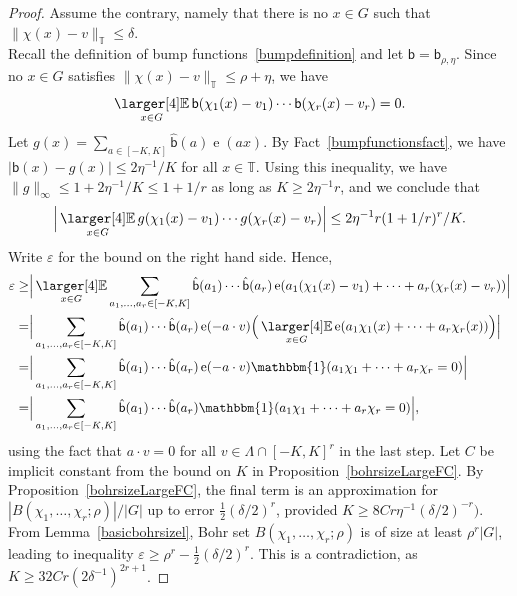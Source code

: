 \documentclass[a4paper,11pt]{article}
\numberwithin{theorem}{section}
\theoremstyle{definition}
\newcommand\id{\mathbbm{1}}
\newcommand{\on}[1]{
	\operatorname{#1}
}
\newcommand{\exx}{
  \mathop{
    \mathchoice{\vcenter{\hbox{\larger[4]$\mathbb{E}$}}}
               {\kern0pt\mathbb{E}}
               {\kern0pt\mathbb{E}}
               {\kern0pt\mathbb{E}}
  }\displaylimits
}
\begin{document}
\begin{proof}
    \indent Assume the contrary, namely that there is no $x \in G$ such that $\|\chi(x)-v\|_{\mathbb{T}} \leq \delta$.\\
    \indent Recall the definition of bump functions~\eqref{bumpdefinition} and let $\mathsf{b} = \mathsf{b}_{\rho, \eta}$. Since no $x \in G$ satisfies $\|\chi(x) -v\|_{\mathbb{T}} \leq \rho + \eta$, we have
    \[\exx_{x \in G} \mathsf{b}(\chi_1(x) - v_1) \cdots \mathsf{b}(\chi_r(x) - v_r) = 0.\]
    Let $g(x) = \sum_{a \in [-K, K]} \hat{\mathsf{b}}(a) \on{e}(a x)$. By Fact~\ref{bumpfunctionsfact}, we have $|\mathsf{b}(x) - g(x)| \leq 2\eta^{-1}/K$ for all $x \in \mathbb{T}$. Using this inequality, we have $\|g\|_{\infty} \leq 1 + 2\eta^{-1}/K \leq 1 + 1/r$ as long as $K \geq 2\eta^{-1} r$, and we conclude that
    \[\Big|\exx_{x \in G} g(\chi_1(x) - v_1) \cdots g(\chi_r(x) - v_r)\Big| \leq 2\eta^{-1} r (1+1/r)^r /K.\]
    Write $\varepsilon$ for the bound on the right hand side. Hence, 
    \begin{align*}\varepsilon \geq &\Big|\exx_{x \in G} \sum_{a_1, \dots, a_r \in [-K, K]} \hat{\mathsf{b}}(a_1) \cdots \hat{\mathsf{b}}(a_r)\on{e}(a_1(\chi_1(x) - v_1) + \dots + a_r(\chi_r(x) - v_r)) \Big| \\
    = &\Big| \sum_{a_1, \dots, a_r \in [-K, K]} \hat{\mathsf{b}}(a_1) \cdots \hat{\mathsf{b}}(a_r) \on{e}(- a \cdot v) \Big(\exx_{x \in G} \on{e}(a_1\chi_1(x) + \dots + a_r \chi_r(x))\Big)\Big|\\
    = &\Big| \sum_{a_1, \dots, a_r \in [-K, K]} \hat{\mathsf{b}}(a_1) \cdots \hat{\mathsf{b}}(a_r) \on{e}(- a \cdot v) \id(a_1\chi_1 + \dots + a_r \chi_r = 0)\Big|\\
    = &\Big| \sum_{a_1, \dots, a_r \in [-K, K]} \hat{\mathsf{b}}(a_1) \cdots \hat{\mathsf{b}}(a_r) \id(a_1\chi_1 + \dots + a_r \chi_r = 0)\Big|,
    \end{align*}
    using the fact that $a \cdot v = 0$ for all $v \in \Lambda \cap [-K, K]^r$ in the last step. Let $C$ be implicit constant from the bound on $K$ in Proposition~\ref{bohrsizeLargeFC}. By Proposition~\ref{bohrsizeLargeFC}, the final term is an approximation for $|B(\chi_1, \dots, \chi_r; \rho)| / |G|$ up to error $\frac{1}{2} (\delta/2)^r$, provided $K \geq 8 C r \eta^{-1} (\delta/2)^{-r})$. From Lemma~\ref{basicbohrsizel}, Bohr set $B(\chi_1, \dots, \chi_r; \rho)$ is of size at least $\rho^r |G|$, leading to inequality $\varepsilon \geq \rho^r - \frac{1}{2} (\delta/2)^r$. This is a contradiction, as $K \geq 32 C r  (2\delta^{-1})^{2r + 1}$.
\end{proof}
\end{document}
